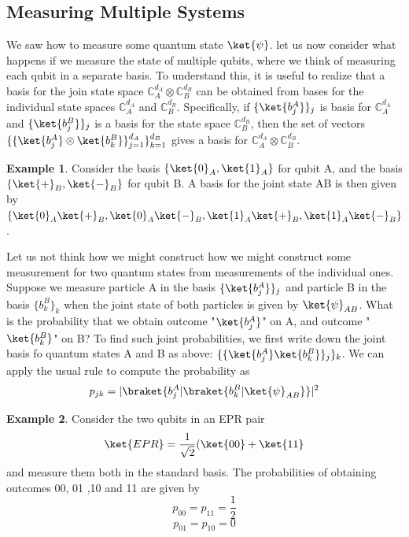\documentclass[12pt, oneside]{book}
\theoremstyle{definition}
\theoremstyle{definition}
\newtheorem{example}{Example}[section]
\theoremstyle{remark}
\begin{document}
\subsection{Measuring Multiple Systems}
We saw how to measure some quantum state $\ket{\psi}$. let us now consider what happens if we measure the state of multiple qubits, where we think of measuring each qubit in a separate basis. To understand this, it is useful to realize that a basis for the join state space $\mathbb{C}_A^{d_A} \otimes \mathbb{C}_B^{d_B}$ can be obtained from bases for the individual state spaces $\mathbb{C}_A^{d_A}$ and $\mathbb{C}_B^{d_B}$. Specifically, if $\{\ket{b_j^A}\}_j$ is basis for $\mathbb{C}_A^{d_A}$ and $\{\ket{b_j^B}\}_j$ is a basis for the state space $\mathbb{C}_B^{d_B}$, then the set of vectors $\{\{\ket{b_j^A}\otimes \ket{b_k^B}\}_{j=1}^{d_A}\}_{k=1}^{d_B}$ gives a basis for $\mathbb{C}_A^{d_A}\otimes \mathbb{C}_B^{d_B}$.

\begin{example}
    Consider the basis $\{\ket{0}_A,\ket{1}_A\}$ for qubit A, and the basis \\$\{\ket{+}_B,\ket{-}_B\}$ for qubit B. A basis for the joint state AB is then given by \\
    $\{\ket{0}_A\ket{+}_B,\ket{0}_A\ket{-}_B,\ket{1}_A\ket{+}_B,\ket{1}_A\ket{-}_B\}$.
\end{example}

Let us not think how we might construct how we might construct some measurement for two quantum states from measurements of the individual ones. Suppose we measure particle A in the basis $\{\ket{b_j^A}\}_j$ and particle B in the basis $\{b_k^B\}_k$ when the joint state of both particles is given by $\ket{\psi}_{AB}$. What is the probability that we obtain outcome "$\ket{b_j^A}$" on A, and outcome "$\ket{b_k^B}$" on B? To find such joint probabilities, we first write down the joint basis fo quantum states A and B as above: $\{\{\ket{b_j^A}\ket{b_k^B}\}_j\}_k$. We can apply the usual rule to compute the probability as 
\[
p_{jk}=|\braket{b_j^A|\braket{b_k^B|\ket{\psi}_{AB}}}|^2
\]
\begin{example}
    Consider the two qubits in an EPR pair
    \[
    \ket{EPR}=\frac{1}{\sqrt{2}}(\ket{00}+\ket{11}
    \]
    and measure them both in the standard basis. The probabilities of obtaining outcomes 00, 01 ,10 and 11 are given by
    \[
    p_{00}=p_{11}=\frac{1}{2}
    \]
    \[
    p_{01}=p_{10}=0
    \]
\end{example}
\end{document}
